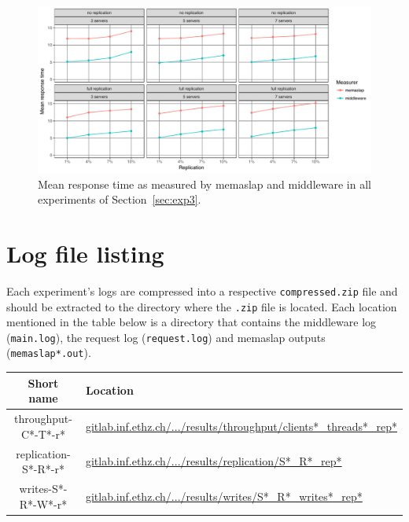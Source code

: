 \documentclass[11pt]{article}
\begin{document}
\begin{figure}[h]
\centering
\includegraphics[width=\textwidth]{../results/writes/graphs/compare_mw_ms.pdf}
\caption{Mean response time as measured by memaslap and middleware in all experiments of Section~\ref{sec:exp3}.}
\label{fig:appa:comparison:exp3}
\end{figure}



\clearpage

\section*{Log file listing}

Each experiment's logs are compressed into a respective \verb+compressed.zip+ file and should be extracted to the directory where the \verb+.zip+ file is located. Each location mentioned in the table below is a directory that contains the middleware log (\verb+main.log+), the request log (\verb+request.log+) and memaslap outputs (\verb+memaslap*.out+). \\

\begin{tabular}{|c|l|}
\hline \textbf{Short name}& \textbf{Location} \\ 
\hline throughput-C*-T*-r* & \href{https://gitlab.inf.ethz.ch/pungast/asl-fall16-project/blob/master/results/throughput}{gitlab.inf.ethz.ch/.../results/throughput/clients*\_threads*\_rep*} \\ 
\hline replication-S*-R*-r* & \href{https://gitlab.inf.ethz.ch/pungast/asl-fall16-project/blob/master/results/replication}{gitlab.inf.ethz.ch/.../results/replication/S*\_R*\_rep*} \\ 
\hline writes-S*-R*-W*-r* & \href{https://gitlab.inf.ethz.ch/pungast/asl-fall16-project/blob/master/results/writes}{gitlab.inf.ethz.ch/.../results/writes/S*\_R*\_writes*\_rep*} \\ 
\hline 
\end{tabular} 
 
\end{document}

